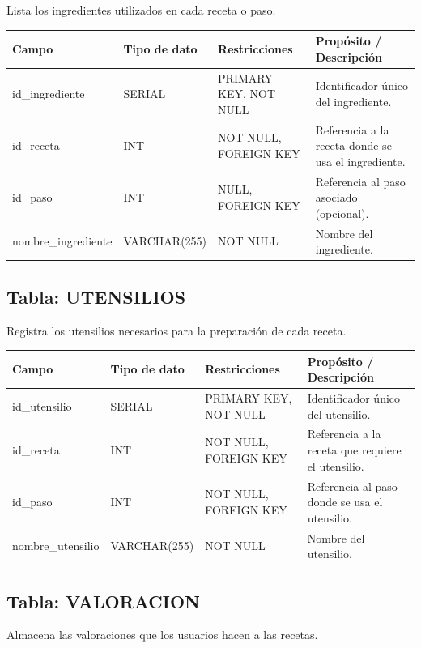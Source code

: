 \documentclass[12pt,a4paper]{article}
\begin{document}
Lista los ingredientes utilizados en cada receta o paso.

\begin{longtable}{|p{3.5cm}|p{2.5cm}|p{3.5cm}|p{5cm}|}
\hline
\textbf{Campo} & \textbf{Tipo de dato} & \textbf{Restricciones} & \textbf{Propósito / Descripción} \\
\hline
id\_ingrediente & SERIAL & PRIMARY KEY, NOT NULL & Identificador único del ingrediente. \\
\hline
id\_receta & INT & NOT NULL, FOREIGN KEY & Referencia a la receta donde se usa el ingrediente. \\
\hline
id\_paso & INT & NULL, FOREIGN KEY & Referencia al paso asociado (opcional). \\
\hline
nombre\_ingrediente & VARCHAR(255) & NOT NULL & Nombre del ingrediente. \\
\hline
\end{longtable}

\subsection{Tabla: UTENSILIOS}

Registra los utensilios necesarios para la preparación de cada receta.

\begin{longtable}{|p{3.5cm}|p{2.5cm}|p{3.5cm}|p{5cm}|}
\hline
\textbf{Campo} & \textbf{Tipo de dato} & \textbf{Restricciones} & \textbf{Propósito / Descripción} \\
\hline
id\_utensilio & SERIAL & PRIMARY KEY, NOT NULL & Identificador único del utensilio. \\
\hline
id\_receta & INT & NOT NULL, FOREIGN KEY & Referencia a la receta que requiere el utensilio. \\
\hline
id\_paso & INT & NOT NULL, FOREIGN KEY & Referencia al paso donde se usa el utensilio. \\
\hline
nombre\_utensilio & VARCHAR(255) & NOT NULL & Nombre del utensilio. \\
\hline
\end{longtable}

\subsection{Tabla: VALORACION}

Almacena las valoraciones que los usuarios hacen a las recetas.
\end{document}
